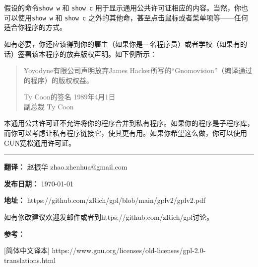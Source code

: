 \documentclass[11pt]{article}
\begin{document}
假设的命令{\tt show w} 和 {\tt show c} 用于显示通用公共许可证相应的内容。当然，你也可以使用{\tt show w} 和 {\tt show c}
之外的其他命，甚至点击鼠标或者菜单项等——任何适合你程序的方式。

如有必要，你还应该得到你的雇主（如果你是一名程序员）或者学校（如果有的话）签署该本程序的放弃版权声明。如下例所示：

\begin{quote}
  Yoyodyne有限公司声明放弃James Hacker所写的“Gnomovision”（编译通过的程序）的版权权益。


  Ty Coon的签名 1989年4月1日 \\
  副总裁 Ty Coon
\end{quote}

本通用公共许可证不允许将你的程序合并到私有程序。如果你的程序是子程序库，而你可以考虑让私有程序链接它，使其更有用。如果你希望这么做，你可以使用GUN宽松通用许可证。

\vfill

\noindent\rule{\textwidth}{0.4pt}

\textbf{翻译：} 赵振华 zhao.zhenhua@gmail.com

\textbf{发布日期：} \today

\textbf{地址：} https://github.com/zRich/gpl/blob/main/gplv2/gplv2.pdf

如有修改建议欢迎发邮件或者到https://github.com/zRich/gpl讨论。

\textbf{参考：} 

[简体中文译本] https://www.gnu.org/licenses/old-licenses/gpl-2.0-translations.html
\end{document}
